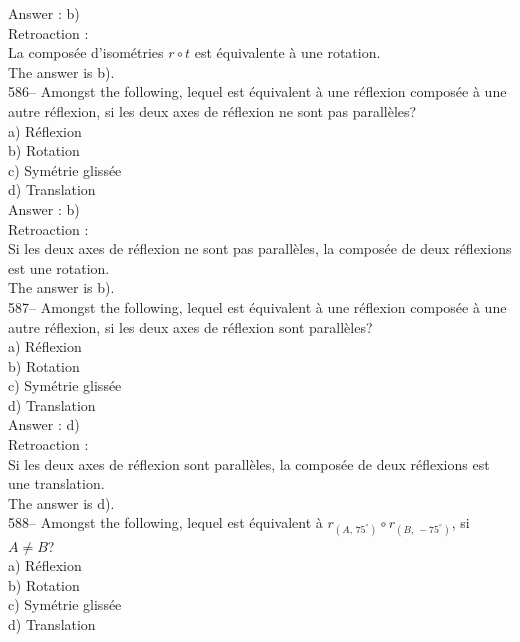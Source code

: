 ﻿\documentclass[letterpaper, 12pt]{article}
\begin{document}
Answer : b) \\

Retroaction : \\
La compos\'ee d'isom\'etries $r\circ t$ est \'equivalente \`a une
rotation.\\
The answer is b).\\

586-- Amongst the following, lequel est \'equivalent \`a une
r\'eflexion compos\'ee \`a une autre r\'eflexion, si les deux axes de
r\'eflexion ne sont pas parall\`eles?\\
a) R\'eflexion\\
b) Rotation\\
c) Sym\'etrie gliss\'ee\\
d) Translation\\

Answer : b) \\

Retroaction : \\
Si les deux axes de r\'eflexion ne sont pas parall\`eles, la compos\'ee de
deux r\'eflexions est une rotation.\\
The answer is b).\\

587-- Amongst the following, lequel est \'equivalent \`a une
r\'eflexion compos\'ee \`a une autre r\'eflexion, si les deux axes de
r\'eflexion sont parall\`eles?\\
a) R\'eflexion\\
b) Rotation\\
c) Sym\'etrie gliss\'ee\\
d) Translation\\

Answer : d) \\

Retroaction : \\
Si les deux axes de r\'eflexion sont parall\`eles, la compos\'ee de deux
r\'eflexions est une translation.\\
The answer is d).\\

588-- Amongst the following, lequel est \'equivalent \`a
$r_{\left(A,\,75^{\circ}\right)} \circ r_{\left(B,\,-75^{\circ}\right) }$,
si $A\neq B$?\\
a) R\'eflexion\\
b) Rotation\\
c) Sym\'etrie gliss\'ee\\
d) Translation\\
\end{document}
